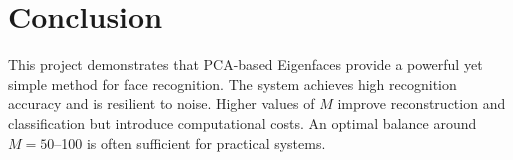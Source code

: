 \documentclass[conference]{IEEEtran}
\begin{document}
\section{Conclusion}
This project demonstrates that PCA-based Eigenfaces provide a powerful yet simple method for face recognition. The system achieves high recognition accuracy and is resilient to noise. Higher values of \(M\) improve reconstruction and classification but introduce computational costs. An optimal balance around \(M=50\)–100 is often sufficient for practical systems.



\end{document}
